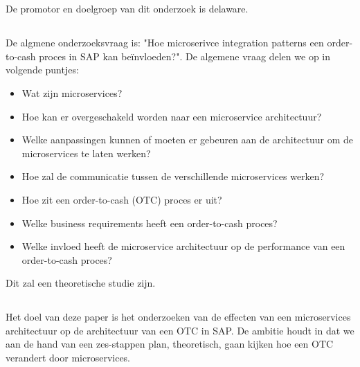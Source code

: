 
\chapter{}
\label{ch:inleiding}

\section{}
\label{sec:probleemstelling}
De promotor en doelgroep van dit onderzoek is delaware.

\section{}
\label{sec:onderzoeksvraag}
De algmene onderzoeksvraag is: "Hoe microserivce integration patterns een order-to-cash proces in SAP kan beïnvloeden?". De algemene vraag delen we op in volgende puntjes:
\begin{itemize}
  \item Wat zijn microservices?
  \item Hoe kan er overgeschakeld worden naar een microservice architectuur?
  \item Welke aanpassingen kunnen of moeten er gebeuren aan de architectuur om de microservices te laten werken?
  \item Hoe zal de communicatie tussen de verschillende microservices werken?
  \item Hoe zit een order-to-cash (OTC) proces er uit?
  \item Welke business requirements heeft een order-to-cash proces?
  \item Welke invloed heeft de microservice architectuur op de performance van een order-to-cash proces?
\end{itemize}
Dit zal een theoretische studie zijn.

\section{}
\label{sec:onderzoeksdoelstelling}
Het doel van deze paper is het onderzoeken van de effecten van een microservices architectuur op de architectuur van een OTC in SAP. De ambitie houdt in dat we aan de hand van een zes-stappen plan, theoretisch, gaan kijken hoe een OTC verandert door microservices.  

